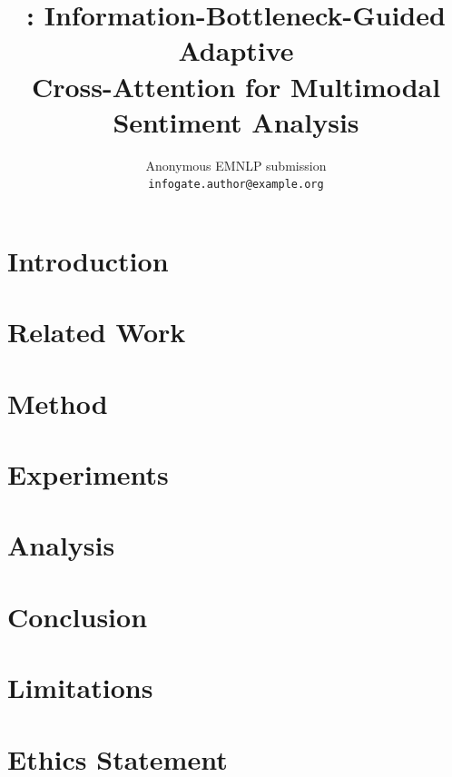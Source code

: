 \documentclass[11pt]{article}
\title{\methodname: Information-Bottleneck-Guided Adaptive\\
       Cross-Attention for Multimodal Sentiment Analysis}
\author{Anonymous EMNLP submission \\
  \texttt{infogate.author@example.org} \\
}
\begin{document}
\maketitle

\begin{abstract}

\end{abstract}

\section{Introduction}
\label{sec:intro}


\section{Related Work}
\label{sec:related}


\section{Method}
\label{sec:method}


\section{Experiments}
\label{sec:exp}


\section{Analysis}
\label{sec:analysis}


\section{Conclusion}
\label{sec:conclusion}


\section*{Limitations}


\section*{Ethics Statement}




\appendix

\end{document}
